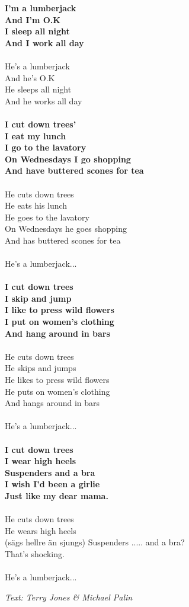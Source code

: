 \vspace{10pt}
\textbf{
I'm a lumberjack\\
And I'm O.K\\
I sleep all night\\
And I work all day\\
}
\\
He's a lumberjack\\
And he's O.K\\
He sleeps all night\\
And he works all day\\
\\
\textbf{
I cut down trees'\\
I eat my lunch\\
I go to the lavatory\\
On Wednesdays I go shopping\\
And have buttered scones for tea\\
}
\\
He cuts down trees\\
He eats his lunch\\
He goes to the lavatory\\
On Wednesdays he goes shopping\\
And has buttered scones for tea\\
\\
He's a lumberjack...\\
\\
\textbf{
I cut down trees\\
I skip and jump\\
I like to press wild flowers\\
I put on women's clothing\\
And hang around in bars\\
}
\\
He cuts down trees\\
He skips and jumps\\
He likes to press wild flowers\\
He puts on women's clothing\\
And hangs around in bars\\
\\
He's a lumberjack...\\
\\
\textbf{
I cut down trees\\
I wear high heels\\
Suspenders and a bra\\
I wish I'd been a girlie\\
Just like my dear mama.\\
}
\\
He cuts down trees\\
He wears high heels\\
(sägs hellre än sjungs) Suspenders ..... and a bra?\\
That's shocking.\\
\\
He's a lumberjack...
\par
\vspace{10pt}
{\footnotesize\textit{Text: Terry Jones \& Michael Palin}}
